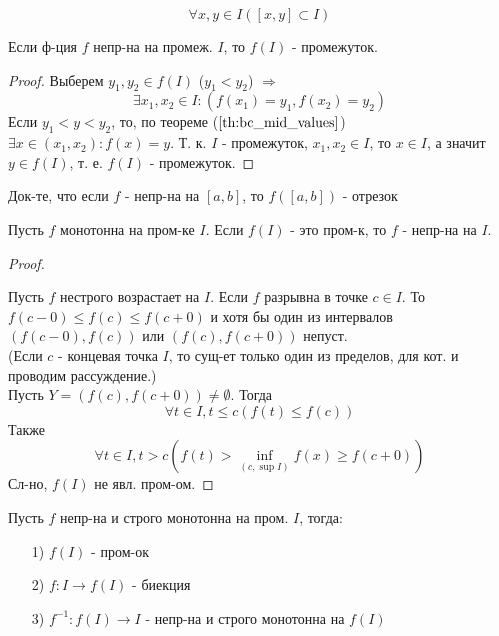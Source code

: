 \[
\forall x, y \in I ([x, y] \subset I)
\]
\begin{consequence}
  \label{cs:cs_th7}
Если ф-ция $f$ непр-на на промеж. $I$, то $f(I)$ - промежуток.
\end{consequence}
\begin{proof}
Выберем $y_1, y_2 \in f(I)$ ($y_1 < y_2$) $\Rightarrow$
\[
  \exists x_1, x_2 \in I \colon (f(x_1) = y_1, f(x_2) = y_2)
\]
Если $y_1 < y < y_2$, то, по теореме ($\ref{th:bc_mid_values}$) $ \exists x \in (x_1, x_2) \colon f(x) = y$. Т. к. $I$ - промежуток, $x_1, x_2 \in I$, то $x \in I$, а значит $y \in f(I)$, т. е. $f(I)$ - промежуток.
\end{proof}
\begin{task}
Док-те, что если $f$ - непр-на на $[a, b]$, то $f([a, b])$ - отрезок
\end{task}
\begin{lemma}
  Пусть $f$ монотонна на пром-ке $I$. Если $f(I)$ - это пром-к, то $f$ - непр-на на $I$.
\end{lemma}
\begin{proof}
~\newline

Пусть $f$ нестрого возрастает на $I$. Если $f$ разрывна в точке $c \in I$. То $f(c - 0) \leq f(c) \leq f(c + 0)$ и хотя бы один из интервалов $(f(c - 0), f(c))$ или $(f(c), f(c + 0))$ непуст.\\

(Если $c$ - концевая точка $I$, то сущ-ет только один из пределов, для кот. и проводим рассуждение.) \\
Пусть $Y = (f(c), f(c + 0)) \neq \emptyset$. Тогда
\[
  \forall t \in I, t \leq c (f(t) \leq f(c))
\]
Также
\[
  \forall t \in I, t > c (f(t) > \underset{(c, \sup I)}{\inf} f(x) \geq f(c + 0))
\]
Сл-но, $f(I)$ не явл. пром-ом.
\end{proof}
\begin{theorem}
  \label{th:rev_func_th}
  Пусть $f$ непр-на и строго монотонна на пром. $I$, тогда:
  \begin{itemize}
    \item [1) ] $f(I)$ - пром-ок
    \item [2) ] $f: I \rightarrow f(I)$ - биекция
    \item [3) ] $f^{-1}: f(I) \rightarrow I$ - непр-на и строго монотонна на $f(I)$
\end{itemize}
\end{theorem}
